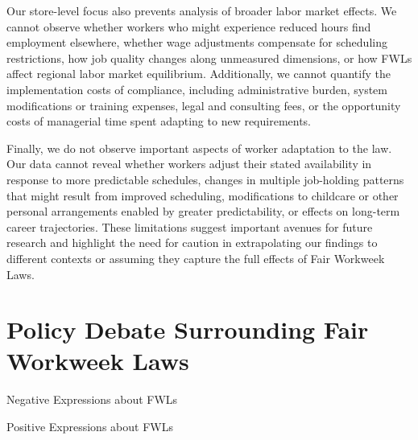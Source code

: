 \documentclass[letterpaper,11pt,leqno]{article}
\theoremstyle{paper}
\newcommand{\note}[2][]{\parbox{\textwidth}{\footnotesize\vspace*{10pt}\textit{#1}#2}}
\begin{document}
Our store-level focus also prevents analysis of broader labor market effects. We cannot observe whether workers who might experience reduced hours find employment elsewhere, whether wage adjustments compensate for scheduling restrictions, how job quality changes along unmeasured dimensions, or how FWLs affect regional labor market equilibrium. Additionally, we cannot quantify the implementation costs of compliance, including administrative burden, system modifications or training expenses, legal and consulting fees, or the opportunity costs of managerial time spent adapting to new requirements.

Finally, we do not observe important aspects of worker adaptation to the law. Our data cannot reveal whether workers adjust their stated availability in response to more predictable schedules, changes in multiple job-holding patterns that might result from improved scheduling, modifications to childcare or other personal arrangements enabled by greater predictability, or effects on long-term career trajectories. These limitations suggest important avenues for future research and highlight the need for caution in extrapolating our findings to different contexts or assuming they capture the full effects of Fair Workweek Laws.

\section{Policy Debate Surrounding Fair Workweek Laws}



\begin{singlespacing}
\begin{table}[H]
\caption{Negative Expressions about FWLs}

\note{\scriptsize \singlespacing
\vspace{-0.60cm}
}
\label{table:tables_against}
\end{table}
\end{singlespacing}

\begin{singlespacing}
\begin{table}[H]
\caption{Positive Expressions about FWLs}

\note{\scriptsize \singlespacing
\vspace{-0.25cm}

}
\label{table:tables_for}
\end{table}
\end{singlespacing}
\end{document}
